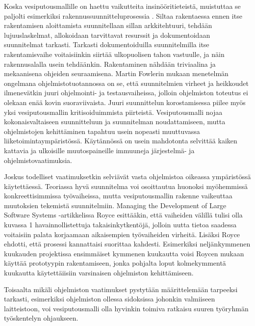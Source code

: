 \documentclass[finnish,12pt]{tktltiki2}
\theoremstyle{definition}
\theoremstyle{remark}
\begin{document}
Koska vesiputousmallille on haettu vaikutteita insinööritieteistä, muistuttaa se paljolti esimerkiksi rakennussuunnitteluprosessia \cite{Sommerville10}. Siltaa rakentaessa ennen itse rakentamisen aloittamista suunnitellaan sillan arkkitehtuuri, tehdään lujuuslaskelmat, allokoidaan tarvittavat resurssit ja dokumentoidaan suunnitelmat tarkasti. Tarkasti dokumentoiduilla suunnitelmilla itse rakentamisvaihe voitaisiinkin siirtää ulkopuolisen tahon vastuulle, ja näin rakennusalalla usein tehdäänkin. \cite{Fowler05} Rakentaminen nähdään triviaalina ja mekaanisena ohjeiden seuraamisena. Martin Fowlerin mukaan menetelmän ongelmana ohjelmistotuotannossa on se, että suunnitelmien virheet ja heikkoudet ilmenevätkin juuri ohjelmointi- ja testausvaiheissa, jolloin ohjelmiston toteutus ei olekaan enää kovin suoraviivaista. Juuri suunnittelun korostamisessa piilee myös yksi vesiputousmallin kritisoiduimmista piirteistä. Vesiputousmalli nojaa kokonaisvaltaiseen suunnitteluun ja suunnitelman noudattamiseen, mutta ohjelmistojen kehittäminen tapahtuu usein nopeasti muuttuvassa liiketoimintaympäristössä. Käytännössä on usein mahdotonta selvittää kaiken kattavia ja ulkoisille muutospaineille immuuneja järjestelmä- ja ohjelmistovaatimuksia. \cite{Sommerville10} 

Joskus todelliset vaatimuksetkin selviävät vasta ohjelmistoa oikeassa ympäristössä käytettäessä. Teoriassa hyvä suunnitelma voi osoittautua huonoksi myöhemmissä konkreettisimmissa työvaiheissa, mutta vesiputousmallin rakenne vaikeuttaa muutoksien tekemistä suunnitelmiin. Managing the Development of Large Software Systems -artikkelissa \cite{Royce1970} Royce esittääkin, että vaiheiden välillä tulisi olla kuvassa 1 havainnollistettuja takaisinkytkentöjä, jolloin uutta tietoa saadessa voitaisiin palata korjaamaan aikaisempien työvaiheiden virheitä. Lisäksi Royce ehdotti, että prosessi kannattaisi suorittaa kahdesti. Esimerkiksi neljänkymmenen kuukauden projektissa ensimmäiset kymmenen kuukautta voisi Roycen mukaan käyttää prototyypin rakentamiseen, jonka pohjalta loput kolmekymmentä kuukautta käytettäiisiin varsinaisen ohjelmiston kehittämiseen.

Toisaalta mikäli ohjelmiston vaatimukset pystytään määrittelemään tarpeeksi tarkasti, esimerkiksi ohjelmiston ollessa sidoksissa johonkin valmiiseen laitteistoon, voi vesiputousmalli olla hyvinkin toimiva ratkaisu suuren työryhmän työskentelyn ohjaukseen.
\end{document}

